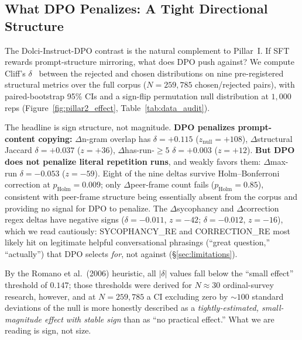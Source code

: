 \documentclass{article}
\begin{document}
\subsection{What DPO Penalizes: A Tight Directional Structure}
\label{sec:pillar2}

\noindent The Dolci-Instruct-DPO contrast is the natural complement to Pillar~I. If SFT rewards prompt-structure mirroring, what does DPO push against? We compute Cliff's $\delta$~\citep{cliff1993dominance} between the rejected and chosen distributions on nine pre-registered structural metrics over the full corpus ($N{=}259{,}785$ chosen/rejected pairs), with paired-bootstrap 95\% CIs and a sign-flip permutation null distribution at $1{,}000$ reps (Figure~\ref{fig:pillar2_effect}, Table~\ref{tab:data_audit}).

The headline is sign structure, not magnitude. \textbf{DPO penalizes prompt-content copying:} $\Delta$n-gram overlap has $\delta{=}{+}0.115$ ($z_{\text{null}}{=}{+}108$), $\Delta$structural Jaccard $\delta{=}{+}0.037$ ($z{=}{+}36$), $\Delta$has-run-$\geq 5$ $\delta{=}{+}0.003$ ($z{=}{+}12$). \textbf{But DPO does not penalize literal repetition runs}, and weakly favors them: $\Delta$max-run $\delta{=}{-}0.053$ ($z{=}{-}59$). Eight of the nine deltas survive Holm--Bonferroni correction at $p_{\text{Holm}}{=}0.009$; only $\Delta$peer-frame count fails ($p_{\text{Holm}}{=}0.85$), consistent with peer-frame structure being essentially absent from the corpus and providing no signal for DPO to penalize. The $\Delta$sycophancy and $\Delta$correction regex deltas have negative signs ($\delta{=}{-}0.011$, $z{=}{-}42$; $\delta{=}{-}0.012$, $z{=}{-}16$), which we read cautiously: \textsc{SYCOPHANCY\_RE} and \textsc{CORRECTION\_RE} most likely hit on legitimate helpful conversational phrasings (``great question,'' ``actually'') that DPO selects \emph{for}, not against (\S\ref{sec:limitations}).

By the Romano et al.~(2006) heuristic, all $|\delta|$ values fall below the ``small effect'' threshold of $0.147$; those thresholds were derived for $N{\approx}30$ ordinal-survey research, however, and at $N{=}259{,}785$ a CI excluding zero by $\sim 100$ standard deviations of the null is more honestly described as a \emph{tightly-estimated, small-magnitude effect with stable sign} than as ``no practical effect.'' What we are reading is sign, not size.
\end{document}
